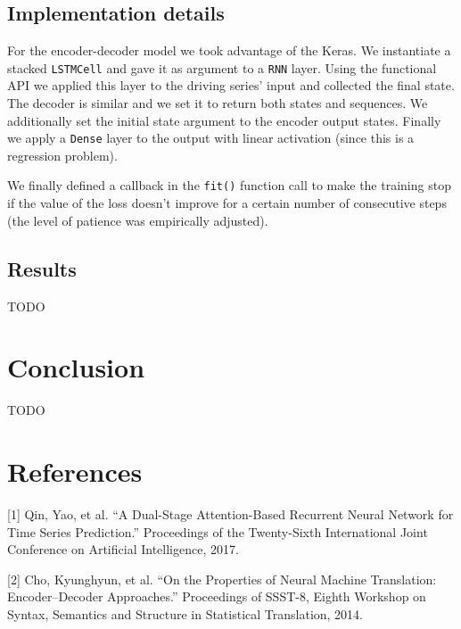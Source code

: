 \documentclass{article}
\begin{document}
\subsection{Implementation details}

For the encoder-decoder model we took advantage of the Keras. We instantiate a
stacked
\texttt{LSTMCell} and gave it as argument to a \texttt{RNN} layer. Using the
functional API we applied this layer to the driving series' input and collected
the final state. The decoder is similar and we set it to return both states and
sequences. We additionally set the initial state argument to the encoder output
states. Finally we apply a \texttt{Dense} layer to the output with linear
activation (since this is a regression problem).

We finally defined a callback in the \texttt{fit()} function call to make the
training stop if the value of the loss doesn't improve for a certain number of
consecutive steps (the level of patience was empirically adjusted).

\subsection{Results}
TODO

\section{Conclusion}

TODO

\newpage
\section*{References}
[1] Qin, Yao, et al. “A Dual-Stage Attention-Based Recurrent Neural Network for
Time Series Prediction.” Proceedings of the Twenty-Sixth International Joint
Conference on Artificial Intelligence, 2017.

[2] Cho, Kyunghyun, et al. “On the Properties of Neural Machine Translation:
Encoder–Decoder Approaches.” Proceedings of SSST-8, Eighth Workshop on Syntax,
Semantics and Structure in Statistical Translation, 2014.
\end{document}
